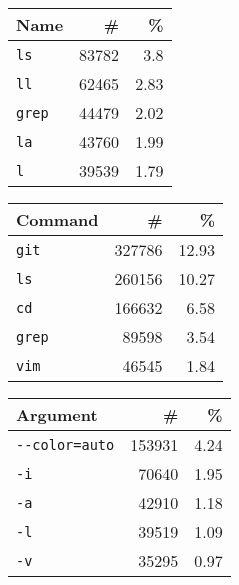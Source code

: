 \begin{tabular}{lrr}
\toprule
   Name &           \# &          \% \\
\midrule
    \verb|ls| &  \num{83782} &   \num{3.8} \\
    \verb|ll| &  \num{62465} &  \num{2.83} \\
  \verb|grep| &  \num{44479} &  \num{2.02} \\
    \verb|la| &  \num{43760} &  \num{1.99} \\
     \verb|l| &  \num{39539} &  \num{1.79} \\
\bottomrule
\end{tabular}
\hspace{0.2cm}
\begin{tabular}{lrr}
    \toprule
           Command &            \# &           \% \\
    \midrule
        \verb|git| &  \num{327786} &  \num{12.93} \\
         \verb|ls| &  \num{260156} &  \num{10.27} \\
         \verb|cd| &  \num{166632} &   \num{6.58} \\
       \verb|grep| &   \num{89598} &   \num{3.54} \\
        \verb|vim| &   \num{46545} &   \num{1.84} \\
    \bottomrule
\end{tabular}
\hspace{0.2cm}
\begin{tabular}{lrr}
    \toprule
                Argument &            \# &          \% \\
    \midrule
     \verb|--color=auto| &  \num{153931} &  \num{4.24} \\
               \verb|-i| &   \num{70640} &  \num{1.95} \\
               \verb|-a| &   \num{42910} &  \num{1.18} \\
               \verb|-l| &   \num{39519} &  \num{1.09} \\
               \verb|-v| &   \num{35295} &  \num{0.97} \\
    \bottomrule
\end{tabular}